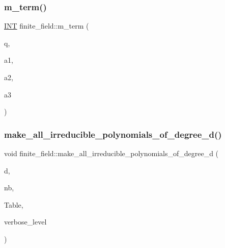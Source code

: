 \mbox{\label{classfinite__field_a0c7e08b29cde397c66f462e40034d774}} 
\subsubsection{\texorpdfstring{m\+\_\+term()}{m\_term()}}
{\footnotesize\ttfamily \mbox{\hyperlink{galois_8h_a09fddde158a3a20bd2dcadb609de11dc}{I\+NT}} finite\+\_\+field\+::m\+\_\+term (\begin{DoxyParamCaption}\item[{\mbox{\hyperlink{galois_8h_a09fddde158a3a20bd2dcadb609de11dc}{I\+NT}}}]{q,  }\item[{\mbox{\hyperlink{galois_8h_a09fddde158a3a20bd2dcadb609de11dc}{I\+NT}}}]{a1,  }\item[{\mbox{\hyperlink{galois_8h_a09fddde158a3a20bd2dcadb609de11dc}{I\+NT}}}]{a2,  }\item[{\mbox{\hyperlink{galois_8h_a09fddde158a3a20bd2dcadb609de11dc}{I\+NT}}}]{a3 }\end{DoxyParamCaption})}

\mbox{\label{classfinite__field_a567a75b3613584db263f4ba6a6418b44}} 
\subsubsection{\texorpdfstring{make\+\_\+all\+\_\+irreducible\+\_\+polynomials\+\_\+of\+\_\+degree\+\_\+d()}{make\_all\_irreducible\_polynomials\_of\_degree\_d()}}
{\footnotesize\ttfamily void finite\+\_\+field\+::make\+\_\+all\+\_\+irreducible\+\_\+polynomials\+\_\+of\+\_\+degree\+\_\+d (\begin{DoxyParamCaption}\item[{\mbox{\hyperlink{galois_8h_a09fddde158a3a20bd2dcadb609de11dc}{I\+NT}}}]{d,  }\item[{\mbox{\hyperlink{galois_8h_a09fddde158a3a20bd2dcadb609de11dc}{I\+NT}} \&}]{nb,  }\item[{\mbox{\hyperlink{galois_8h_a09fddde158a3a20bd2dcadb609de11dc}{I\+NT}} $\ast$\&}]{Table,  }\item[{\mbox{\hyperlink{galois_8h_a09fddde158a3a20bd2dcadb609de11dc}{I\+NT}}}]{verbose\+\_\+level }\end{DoxyParamCaption})}

